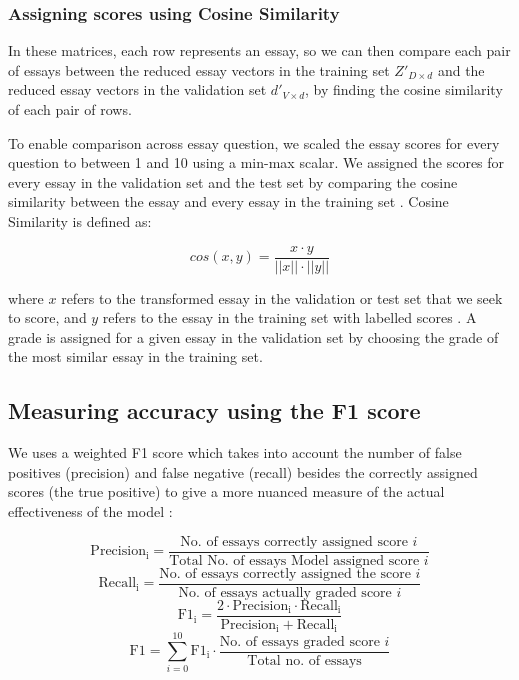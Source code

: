 \documentclass[10pt,letterpaper]{article}
\begin{document}
\subsubsection{Assigning scores using Cosine Similarity}
In these matrices, each row represents an essay, so we can then compare each pair of essays between the reduced essay vectors in the training set $Z'_{D\times d}$ and the reduced essay vectors in the validation set $d'_{V \times d}$, by finding the cosine similarity of each pair of rows. 

To enable comparison across essay question, we scaled the essay scores for every question to between 1 and 10 using a min-max scalar. We assigned the scores for every essay in the validation set and the test set by comparing the cosine similarity between the essay and every essay in the training set \cite{islam2010automated}. Cosine Similarity is defined as:

$$cos(x, y) = \frac {x \cdot y}{||x|| \cdot ||y||}$$

where $x$ refers to the transformed essay in the validation or test set that we seek to score, and $y$ refers to the essay in the training set with labelled scores \cite{islam2010automated}. A grade is assigned for a given essay in the validation set by choosing the grade of the most similar essay in the training set.

\subsection{Measuring accuracy using the F1 score}

We uses a weighted F1 score which takes into account the number of false positives (precision) and false negative (recall) besides the correctly assigned scores (the true positive) to give a more nuanced measure of the actual effectiveness of the model \cite{islam2010automated}: 

$$\mathrm{Precision_i} = \frac {\textrm{No. of essays correctly assigned score } i} {\textrm{Total No. of essays Model assigned score } i}$$
$$\mathrm{Recall_i} = \frac{\textrm{No. of essays correctly assigned the score } i}{\textrm{No. of essays actually graded score } i}$$
$$\mathrm{F1_i} = \frac{\mathrm{2 \cdot \mathrm{Precision_i} \cdot \mathrm{Recall_i}}}{\mathrm{Precision_i + Recall_i}}$$
$$\mathrm{F1} = \sum_{i=0}^{10} \mathrm{F1_i} \cdot \frac{\textrm{No. of essays graded score } i} {\textrm{Total no. of essays}}$$
\end{document}
